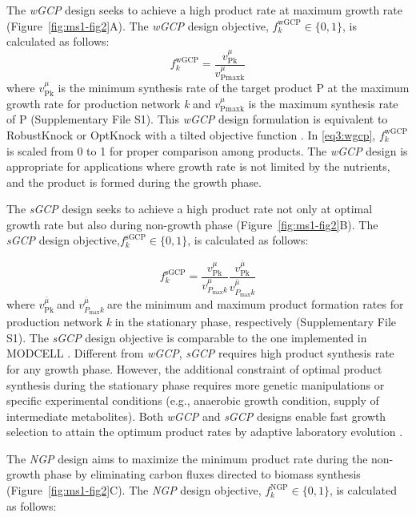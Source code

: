 The \emph{wGCP} design seeks to achieve a high product rate at maximum growth rate (Figure~\ref{fig:ms1-fig2}A).
The \emph{wGCP} design objective, $f_{k}^{\text{wGCP}} \in \{0, 1\}$, is calculated as follows:
\begin{equation}
    f_{k}^{\text{wGCP}} = \frac{v_{\text{Pk}}^{\mu}}{v_{\text{Pmaxk}}^{\mu}} \label{eq3:wgcp}
\end{equation}
\noindent where \(v_{\text{Pk}}^{\mu}\) is the minimum synthesis rate of the target product P at the maximum growth rate for production network \emph{k} and \(v_{\text{Pmaxk}}^{\mu}\) is the maximum synthesis rate of P (Supplementary File S1).
This \emph{wGCP} design formulation is equivalent to RobustKnock \citep{tepper2010} or OptKnock with a tilted objective function \citep{burgard2003, feist2010, yang2011}.
In \eqref{eq3:wgcp}, \(f_{k}^{\text{wGCP}}\) is scaled from 0 to 1 for proper comparison among products.
The \emph{wGCP} design is appropriate for applications where growth rate is not limited by the nutrients, and the product is formed during the growth phase.

The \emph{sGCP} design seeks to achieve a high product rate not only at optimal growth rate but also during non-growth phase (Figure~\ref{fig:ms1-fig2}B).
The \emph{sGCP} design objective,$f_{k}^{\text{sGCP}} \in \{0, 1\}$, is calculated as follows:

\begin{equation}
    f_{k}^{\text{sGCP}} = \frac{v_{\text{Pk}}^{\mu}}{v_{P_{\max}k}^{\mu}} \frac{v_{\text{Pk}}^{\overline{\mu}}}{v_{P_{\max}k}^{\overline{\mu}}} \label{eq3:sgcp}
\end{equation}
\noindent where \(v_{\text{Pk}}^{\overline{\mu}}\ \)and \(v_{P_{\max}k}^{\overline{\mu}}\ \)are the minimum and maximum product formation rates for production network \emph{k} in the stationary phase, respectively (Supplementary File S1).
The \emph{sGCP} design objective is comparable to the one implemented in MODCELL \citep{trinh2015}.
Different from \emph{wGCP}, \emph{sGCP} requires high product synthesis rate for any growth phase.
However, the additional constraint of optimal product synthesis during the stationary phase requires more genetic manipulations or specific experimental conditions (e.g., anaerobic growth condition, supply of intermediate metabolites).
Both \emph{wGCP} and \emph{sGCP} designs enable fast growth selection to attain the optimum product rates by adaptive laboratory evolution \citep{fong2005, trinh2009bc}.

The \emph{NGP} design aims to maximize the minimum product rate during the non-growth phase by eliminating carbon fluxes directed to biomass synthesis (Figure~\ref{fig:ms1-fig2}C).
The \emph{NGP} design objective, $f_{k}^{\text{NGP}}\in \{0, 1\}$, is calculated as follows:

